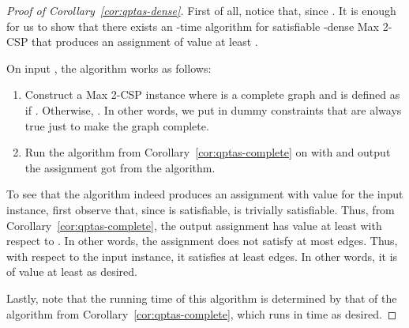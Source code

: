 \documentclass{article}
\begin{document}
\begin{proof}[Proof of Corollary~\ref{cor:qptas-dense}]
  First of all, notice that, since . It is enough for us to show that there exists an -time algorithm for satisfiable -dense {\sc Max 2-CSP} that produces an assignment of value at least .

  On input , the algorithm works as follows:
  \begin{enumerate}
    \item Construct a {\sc Max 2-CSP} instance  where  is a complete graph and  is defined as  if . Otherwise, . In other words, we put in dummy constraints that are always true just to make the graph complete.
    \item Run the algorithm from Corollary~\ref{cor:qptas-complete} on  with  and output the assignment got from the algorithm.
  \end{enumerate}

  To see that the algorithm indeed produces an assignment with value  for the input instance, first observe that, since  is satisfiable,   is trivially satisfiable. Thus, from Corollary~\ref{cor:qptas-complete}, the output assignment has value at least  with respect to . In other words, the assignment does not satisfy at most  edges. Thus, with respect to the input instance, it satisfies at least  edges. In other words, it is of value at least  as desired.

  Lastly, note that the running time of this algorithm is determined by that of the algorithm from Corollary~\ref{cor:qptas-complete}, which runs in  time as desired.
\end{proof}
\end{document}
